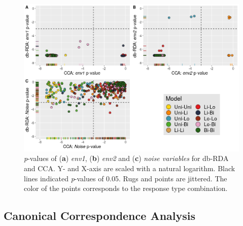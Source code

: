 		
	
		\begin{figure}[h!]
			\centering
			\includegraphics[width=1\linewidth]{../02_Figures/P-Compare}
			\caption{
				\textit{p}-values of (\textbf{a}) \textit{env1},   (\textbf{b}) \textit{env2} and (\textbf{c}) \textit{noise variables} for db-RDA and CCA. Y- and X-axis are scaled with a natural logarithm. Black lines indicated \textit{p}-values of 0.05. Rugs and points are jittered. The color of the points corresponds to the response type combination. 
			}
			\label{fig:p-compare}
		\end{figure}


	\subsection{Canonical Correspondence Analysis}

